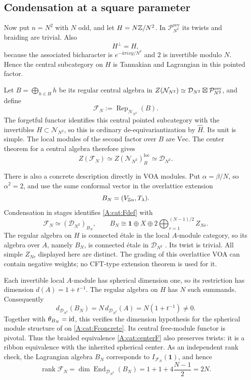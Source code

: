 \documentclass[11pt]{article}
\newcommand{\one}{\mathbf1}\newcommand{\D}{\mathcal D}\newcommand{\Dcat}{\mathcal D}
\newcommand{\Ncat}{\mathcal N}\newcommand{\Pcat}{\mathcal P}\newcommand{\Fcat}{\mathcal F}
\newcommand{\rank}{\operatorname{rank}}\newcommand{\End}{\operatorname{End}}
\numberwithin{equation}{section}
\begin{document}
\subsection{Condensation at a square parameter}\label{A:cat:condensation}
Now put $n=N^2$ with $N$ odd, and let $H=N\mathbb Z/N^2$. In $\Pcat_{N^2}^{\mathrm{rev}}$ its twists and braiding are trivial. Also
\[
 H^\perp=H,
\]
because the associated bicharacter is $e^{-4\pi ixy/N^2}$ and $2$ is invertible modulo $N$. Hence the central subcategory on $H$ is Tannakian and Lagrangian in this pointed factor.

Let $B=\bigoplus_{h\in H}h$ be its regular central algebra in
$Z(\Ncat_{N^2})\simeq\D_{N^2}\bo\Pcat_{N^2}^{\mathrm{rev}}$, and define
\begin{equation}\label{A:cat:Fdef}
 \Fcat_N:=\operatorname{Rep}_{\Ncat_{N^2}}(B).
\end{equation}
The forgetful functor identifies this central pointed subcategory with the invertibles $H\subset\Ncat_{N^2}$, so this is ordinary de-equivariantization by $\widehat H$. Its unit is simple. The local modules of the second factor over $B$ are $\mathrm{Vec}$. The center theorem for a central algebra \cite[Theorem 3.20]{A:DMNO} therefore gives
\begin{equation}\label{A:cat:centerF}
 Z(\Fcat_N)\simeq Z(\Ncat_{N^2})_B^{\mathrm{loc}}
 \simeq\D_{N^2}.
\end{equation}

There is also a concrete description directly in VOA modules. Put $\alpha=\beta/N$, so $\alpha^2=2$, and use the same conformal vector in the overlattice extension
\[
 B_N=(V_{\mathbb Z\alpha},T_\lambda).
\]
Condensation in stages identifies \eqref{A:cat:Fdef} with
\begin{equation}\label{A:cat:Fconcrete}
 \Fcat_N\simeq(\D_{N^2})_{B_N},\qquad
 B_N\cong\one\oplus X\oplus
 2\bigoplus_{r=1}^{(N-1)/2} Z_{Nr}.
\end{equation}
The regular algebra on $H$ is connected \'etale in the local $A$-module category, so its algebra over $A$, namely $B_N$, is connected \'etale in $\D_{N^2}$ \cite[Proposition 3.16]{A:DMNO}. Its twist is trivial. All simple $Z_{Nr}$ displayed here are distinct. The grading of this overlattice VOA can contain negative weights; no CFT-type extension theorem is used for it.

Each invertible local $A$-module has spherical dimension one, so its restriction has dimension $d(A)=1+t^{-1}$. The regular algebra on $H$ has $N$ such summands. Consequently
\[
d_{\D_{N^2}}(B_N)=N\,d_{\D_{N^2}}(A)=N(1+t^{-1})\ne0.
\]
Together with $\theta_{B_N}=\operatorname{id}$, this verifies the dimension hypothesis for the spherical module structure of \cite{A:KO} on \eqref{A:cat:Fconcrete}. Its central free-module functor is pivotal. Thus the braided equivalence \eqref{A:cat:centerF} also preserves twists: it is a ribbon equivalence with the inherited spherical center. As an independent rank check, the Lagrangian algebra $B_N$ corresponds to $I_{\Fcat_N}(\one)$, and hence
\[
 \rank\Fcat_N=\dim\End_{\D_{N^2}}(B_N)
 =1+1+4\frac{N-1}{2}=2N.
\]
\end{document}
